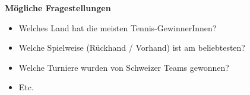 \textbf{Mögliche Fragestellungen}
\begin{itemize}
\item Welches Land hat die meisten Tennis-GewinnerInnen?
\item Welche Spielweise (Rückhand / Vorhand) ist am beliebtesten?
\item Welche Turniere wurden von Schweizer Teams gewonnen?
\item Etc.
\end{itemize}